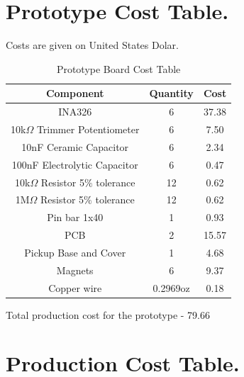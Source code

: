 \begin{annexesenv}
\chapter{Prototype Cost Table.}

Costs are given on United States Dolar.\\
\begin{table}[htb]
  \begin{center}
    \ABNTEXreducedfont
    \caption[Prototype Board Cost Table]{Prototype Board Cost Table}
    \label{Prototype-cost}
    \begin{tabular}{c|c|c}
      \textbf{Component} & \textbf{Quantity} & \textbf{Cost} \\
    \hline
    \hline
    INA326 & 6 & 37.38\\ \hline
    10k$\Omega$ Trimmer Potentiometer & 6 & 7.50 \\ \hline
    10nF Ceramic Capacitor & 6 & 2.34 \\ \hline
    100nF Electrolytic Capacitor & 6 & 0.47 \\ \hline
    10k$\Omega$ Resistor 5$\%$ tolerance & 12 & 0.62 \\ \hline
    1M$\Omega$ Resistor 5$\%$ tolerance & 12 & 0.62 \\ \hline
    Pin bar 1x40 & 1 & 0.93 \\ \hline
    PCB & 2 & 15.57 \\ \hline
    Pickup Base and Cover & 1 & 4.68 \\ \hline
    Magnets & 6 & 9.37 \\ \hline
    Copper wire & 0.2969oz & 0.18 \\ \hline
  \end{tabular}
\end{center}
\end{table}

Total production cost for the prototype - 79.66

\chapter{Production Cost Table.}


\end{annexesenv}
